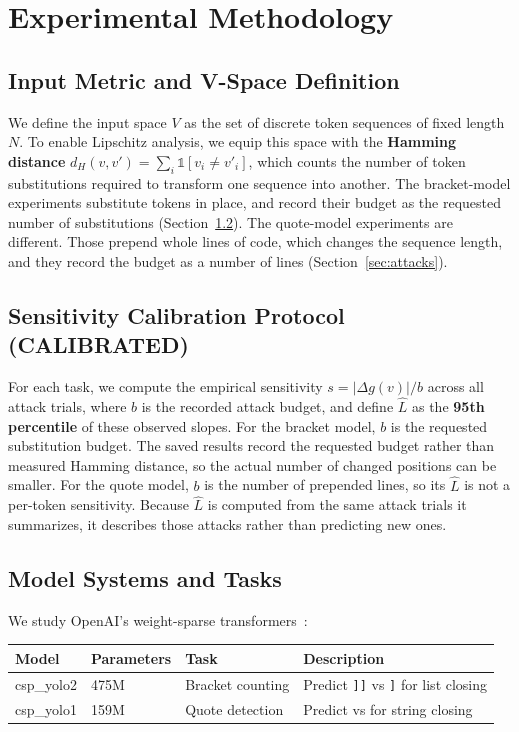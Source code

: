 \documentclass[11pt]{article}
\newcommand{\lab}[1]{{\footnotesize\MakeUppercase{#1}}}
\newcommand{\calibrated}{\lab{calibrated}}
\newcommand{\rb}{\texttt{]}}
\newcommand{\rbb}{\texttt{]]}}
\newcommand{\dq}{\texttt{\textquotedbl}}
\newcommand{\sq}{\texttt{\textquotesingle}}
\newcommand{\Lhat}{\hat{L}}
\begin{document}
\section{Experimental Methodology}\label{sec:methods}

\subsection{Input Metric and V-Space Definition}
We define the input space $V$ as the set of discrete token sequences of fixed length $N$. To enable Lipschitz analysis, we equip this space with the \textbf{Hamming distance} $d_H(v, v') = \sum_i \mathbb{1}[v_i \neq v'_i]$, which counts the number of token substitutions required to transform one sequence into another. The bracket-model experiments substitute tokens in place, and record their budget as the requested number of substitutions (Section~\ref{sec:calib}). The quote-model experiments are different. Those prepend whole lines of code, which changes the sequence length, and they record the budget as a number of lines (Section~\ref{sec:attacks}).

\subsection{Sensitivity Calibration Protocol (\calibrated)}\label{sec:calib}
For each task, we compute the empirical sensitivity $s = |\Delta g(v)| / b$ across all attack trials, where $b$ is the recorded attack budget, and define $\Lhat$ as the \textbf{95th percentile} of these observed slopes. For the bracket model, $b$ is the requested substitution budget. The saved results record the requested budget rather than measured Hamming distance, so the actual number of changed positions can be smaller. For the quote model, $b$ is the number of prepended lines, so its $\Lhat$ is not a per-token sensitivity. Because $\Lhat$ is computed from the same attack trials it summarizes, it describes those attacks rather than predicting new ones.

\subsection{Model Systems and Tasks}
We study OpenAI's weight-sparse transformers~\cite{gao2025}:
\begin{center}
\small
\begin{tabular}{@{}llll@{}}
\toprule
Model & Parameters & Task & Description \\
\midrule
csp\_yolo2 & 475M & Bracket counting & Predict \rbb{} vs \rb{} for list closing \\
csp\_yolo1 & 159M & Quote detection & Predict \dq{} vs \sq{} for string closing \\
\bottomrule
\end{tabular}
\end{center}
\end{document}
